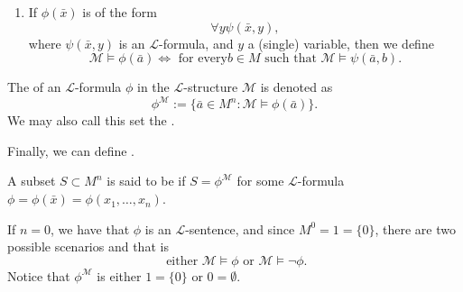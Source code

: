 \documentclass[notoc,notitlepage]{tufte-book}
\begin{document}
\begin{defn}
\begin{enumerate}
    \item If $\phi(\bar{x})$ is of the form
      \begin{equation*}
        \forall y \psi(\bar{x}, y),
      \end{equation*}
      where $\psi(\bar{x}, y)$ is an $\mathcal{L}$-formula, and $y$ a (single) variable, then we define
      \begin{equation*}
        \mathcal{M} \models \phi(\bar{a}) \iff \text{ for every} b \in M \text{ such that } \mathcal{M} \models \psi(\bar{a}, b).
      \end{equation*}
  \end{enumerate}
\end{defn}

\begin{note}
  The  of an $\mathcal{L}$-formula $\phi$ in the $\mathcal{L}$-structure $\mathcal{M}$ is denoted as
  \begin{equation*}
    \phi^\mathcal{M} := \{ \bar{a} \in M^n : \mathcal{M} \models \phi(\bar{a}) \}.
  \end{equation*}
  We may also call this set the . 
\end{note}

Finally, we can define .

\begin{defn}\label{defn:l_definable}
  A subset $S \subset M^n$ is said to be  if $S = \phi^\mathcal{M}$ for some $\mathcal{L}$-formula $\phi = \phi(\bar{x}) = \phi(x_1, \ldots, x_n)$.
\end{defn}

\begin{remark}
  If $n = 0$, we have that $\phi$ is an $\mathcal{L}$-sentence, and since $M^0 = 1 = \{ 0 \}$, there are two possible scenarios and that is
  \begin{equation*}
    \text{ either } \mathcal{M} \models \phi \text{ or } \mathcal{M} \models \neg \phi.
  \end{equation*}
  Notice that $\phi^\mathcal{M}$ is either $1 = \{ 0 \}$ or $0 = \emptyset$.
\end{remark}
\end{document}
